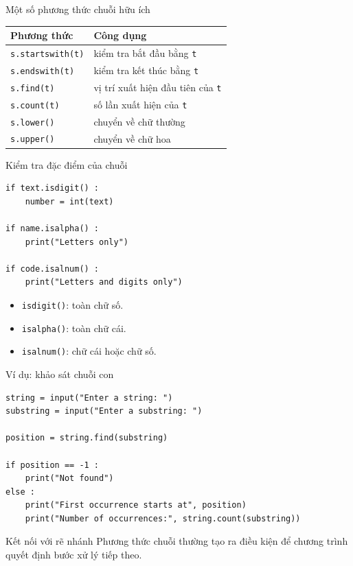 \documentclass[aspectratio=169,11pt]{beamer}
\newcommand{\code}[1]{\texttt{#1}}
\begin{document}
\begin{frame}{Một số phương thức chuỗi hữu ích}
\begin{center}
\begin{tabular}{ll}
\toprule
Phương thức & Công dụng \\
\midrule
\code{s.startswith(t)} & kiểm tra bắt đầu bằng \code{t} \\
\code{s.endswith(t)} & kiểm tra kết thúc bằng \code{t} \\
\code{s.find(t)} & vị trí xuất hiện đầu tiên của \code{t} \\
\code{s.count(t)} & số lần xuất hiện của \code{t} \\
\code{s.lower()} & chuyển về chữ thường \\
\code{s.upper()} & chuyển về chữ hoa \\
\bottomrule
\end{tabular}
\end{center}
\end{frame}

\begin{frame}[fragile]{Kiểm tra đặc điểm của chuỗi}
\begin{lstlisting}[style=py]
if text.isdigit() :
    number = int(text)

if name.isalpha() :
    print("Letters only")

if code.isalnum() :
    print("Letters and digits only")
\end{lstlisting}
\begin{itemize}
  \item \code{isdigit()}: toàn chữ số.
  \item \code{isalpha()}: toàn chữ cái.
  \item \code{isalnum()}: chữ cái hoặc chữ số.
\end{itemize}
\end{frame}

\begin{frame}[fragile]{Ví dụ: khảo sát chuỗi con}
\begin{lstlisting}[style=py]
string = input("Enter a string: ")
substring = input("Enter a substring: ")

position = string.find(substring)

if position == -1 :
    print("Not found")
else :
    print("First occurrence starts at", position)
    print("Number of occurrences:", string.count(substring))
\end{lstlisting}
\begin{block}{Kết nối với rẽ nhánh}
Phương thức chuỗi thường tạo ra điều kiện để chương trình quyết định bước xử lý tiếp theo.
\end{block}
\end{frame}
\end{document}
